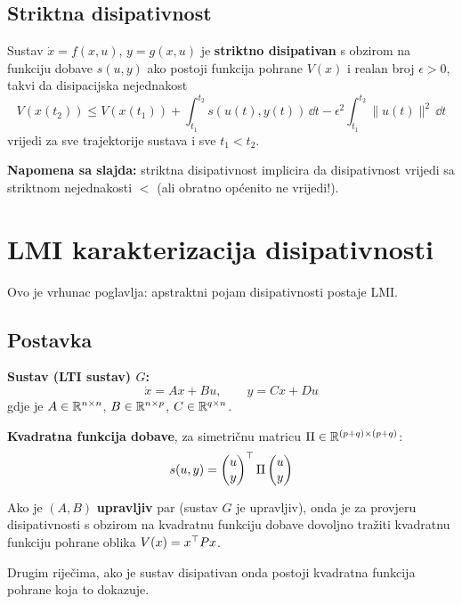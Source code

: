\subsection{Striktna disipativnost}

\begin{definicija}
Sustav $\dot x = f(x,u)$, $y = g(x,u)$ je \textbf{striktno disipativan} s
obzirom na funkciju dobave $s(u,y)$ ako postoji funkcija pohrane $V(x)$ i
realan broj $\epsilon > 0$, takvi da disipacijska nejednakost
\[
V(x(t_2)) \le V(x(t_1)) + \int_{t_1}^{t_2}s(u(t),y(t))\,\dd t
- \epsilon^2\int_{t_1}^{t_2}\|u(t)\|^2\,\dd t
\]
vrijedi za sve trajektorije sustava i sve $t_1 < t_2$.
\end{definicija}

\textbf{Napomena sa slajda:} striktna disipativnost implicira da disipativnost
vrijedi sa striktnom nejednakosti $<$ (ali obratno općenito ne vrijedi!).

\section{LMI karakterizacija disipativnosti}
\label{sec:lmi-disipativnost}

Ovo je vrhunac poglavlja: apstraktni pojam disipativnosti postaje LMI.

\subsection{Postavka}

\textbf{Sustav (LTI sustav) $G$:}
\[
\dot x = Ax + Bu, \qquad y = Cx + Du
\]
gdje je $A \in \mathbb{R}^{n\times n}$, $B \in \mathbb{R}^{n\times p}$,
$C \in \mathbb{R}^{q\times n}$.

\textbf{Kvadratna funkcija dobave}, za simetričnu matricu
$\Pi \in \mathbb{R}^{(p+q)\times(p+q)}$:
\[
s(u,y) = \begin{pmatrix}u\\y\end{pmatrix}^{\top} \Pi
\begin{pmatrix}u\\y\end{pmatrix}
\]

\begin{teorem}
Ako je $(A,B)$ \textbf{upravljiv} par (sustav $G$ je upravljiv), onda je za
provjeru disipativnosti s obzirom na kvadratnu funkciju dobave dovoljno tražiti
kvadratnu funkciju pohrane oblika $V(x) = x^{\top} Px$.

Drugim riječima, ako je sustav disipativan onda postoji kvadratna funkcija
pohrane koja to dokazuje.
\end{teorem}

